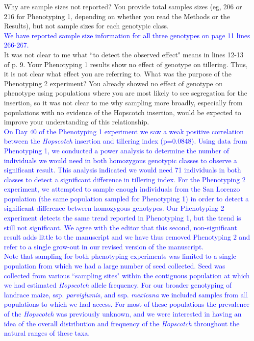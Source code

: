 \documentclass[11pt]{article}
\newcommand{\res}[1]{\noindent \textcolor{blue}{{#1}} \\}
\begin{document}
Why are sample sizes not reported?  You provide total samples sizes (eg, 206 or 216 for Phenotyping 1, depending on whether you read the Methods or the Results), but not sample sizes for each genotypic class.\\

\res{We have reported sample size information for all three genotypes on page 11 lines 266-267.} 

It was not clear to me what ``to detect the observed effect" means in lines 12-13 of p. 9.  Your Phenotyping 1 results show no effect of genotype on tillering.  Thus, it is not clear what effect you are referring to. What was the purpose of the Phenotyping 2  experiment?  You already showed no effect of genotype on phenotype using populations where you are most likely to see segregation for the insertion, so it was not clear to me why sampling more broadly, especially from populations with no evidence of the Hopscotch insertion, would be expected to improve your understanding of this relationship.\\

\res{On Day 40 of the Phenotyping 1 experiment we saw a weak positive correlation between the \emph{Hopscotch} insertion and tillering index (p=0.0848).  
Using data from Phenotyping 1, we conducted a power analysis to determine the number of individuals we would need in both homozygous genotypic classes to observe a significant result.
This analysis indicated we would need 71 individuals in both classes to detect a significant difference in tillering index.  
For the Phenotyping 2 experiment, we attempted to sample enough individuals from the San Lorenzo population (the same population sampled for Phenotyping 1) in order to detect a significant difference between homozygous genotypes.  
Our Phenotyping 2 experiment detects the same trend reported in Phenotyping 1, but the trend is still not significant.
We agree with the editor that this second, non-significant result adds little to the manuscript and we have thus removed Phenotyping 2 and refer to a single grow-out in our revised version of the manuscript.}

\res{Note that sampling for both phenotyping experiments was limited to a single population from which we had a large number of seed collected. Seed was collected from various ``sampling sites" within the contiguous population at which we had estimated \emph{Hopscotch} allele frequency. For our broader genotyping of landrace maize, ssp. \emph{parviglumis}, and ssp. \emph{mexicana} we included samples from all populations to which we had access. For most of these populations the prevalence of the \emph{Hopscotch} was previously unknown, and we were interested in having an idea of the overall distribution and frequency of the \emph{Hopscotch} throughout the natural ranges of these taxa.}
\end{document}

